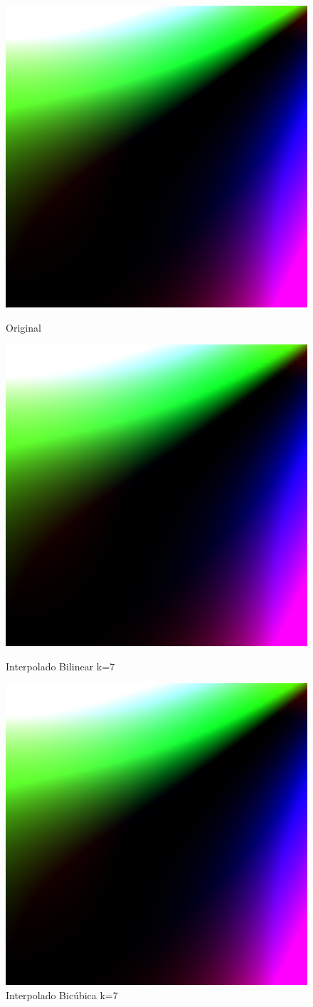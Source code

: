 \documentclass[12pt]{article}
\begin{document}
\begin{figure}[H]
  \centering
  \begin{minipage}{.5\textwidth}
    \centering
    \includegraphics[width=.4\linewidth]{imagens/img_f/f3.png}
    \caption{Original}
  \end{minipage}
  \begin{minipage}{.5\linewidth}
  \end{minipage}
  \begin{minipage}{.5\textwidth}
    \centering
    \includegraphics[width=.4\linewidth]{imagens/img_f/f3_1_7_1.png}
    \caption{Interpolado Bilinear k=7}
  \end{minipage}%
  \begin{minipage}{.5\textwidth}
    \centering
    \includegraphics[width=.4\linewidth]{imagens/img_f/f3_2_7_1.png}
    \caption{Interpolado Bicúbica k=7}
  \end{minipage}
\end{figure}
\end{document}
